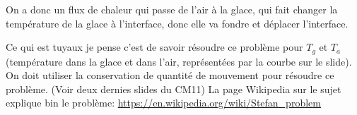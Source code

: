 On a donc un flux de chaleur qui passe de l'air à la glace, qui fait changer la température de la glace à l'interface, donc elle va fondre et déplacer l'interface.

Ce qui est tuyaux je pense c'est de savoir résoudre ce problème pour $T_g$ et $T_a$ (température dans la glace et dans l'air, représentées par la courbe sur le slide). On doit utiliser la conservation de quantité de mouvement pour résoudre ce problème. (Voir deux dernies slides du CM11)
La page Wikipedia sur le sujet explique bin le problème: \url{https://en.wikipedia.org/wiki/Stefan_problem}


